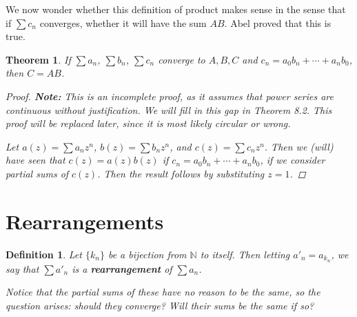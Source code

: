 \documentclass{scrbook}
\newcommand{\N}{\mathbb{N}}
\newtheorem{theorem}{Theorem}
\newtheorem{definition}{Definition}
\begin{document}
We now wonder whether this definition of product makes sense in the sense that if $\sum c_n$ converges, whether it will have the sum $AB$. Abel proved that this is true. 

\begin{theorem} %
If $\sum a_n$, $\sum b_n$, $\sum c_n$ converge to $A, B, C$ and $c_n = a_0 b_n + \dotsb + a_nb_0$, then $C = AB$.

\begin{proof}
\textbf{Note:} This is an incomplete proof, as it assumes that power series are continuous without justification. We will fill in this gap in Theorem 8.2. This proof will be replaced later, since it is most likely circular or wrong.

Let $a(z) = \sum a_nz^n$, $b(z) = \sum b_nz^n$, and $c(z) = \sum c_nz^n$. Then we (will) have seen that $c(z) = a(z)b(z)$ if $c_n = a_0b_n + \dotsb + a_nb_0$, if we consider partial sums of $c(z)$. Then the result follows by substituting $z = 1$.
\end{proof}
\end{theorem}

\section{Rearrangements}

\begin{definition}
Let $\{k_n\}$ be a bijection from $\N$ to itself. Then letting $a'_n = a_{k_n}$, we say that $\sum a'_n$ is a \textbf{rearrangement} of $\sum a_n$.

Notice that the partial sums of these have no reason to be the same, so the question arises: should they converge? Will their sums be the same if so?
\end{definition}
\end{document}
